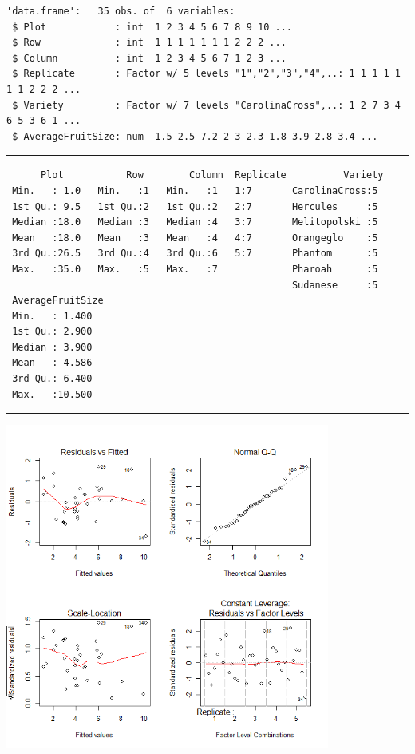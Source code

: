 \documentclass[a4paper, 10pt, fleqn, twosided]{memoir}
\begin{document}
\begin{tcolorbox}[title = Exercise 3 output continued]
\begin{verbatim}
'data.frame':   35 obs. of  6 variables:
 $ Plot            : int  1 2 3 4 5 6 7 8 9 10 ...
 $ Row             : int  1 1 1 1 1 1 1 2 2 2 ...
 $ Column          : int  1 2 3 4 5 6 7 1 2 3 ...
 $ Replicate       : Factor w/ 5 levels "1","2","3","4",..: 1 1 1 1 1 1 1 2 2 2 ...
 $ Variety         : Factor w/ 7 levels "CarolinaCross",..: 1 2 7 3 4 6 5 3 6 1 ...
 $ AverageFruitSize: num  1.5 2.5 7.2 2 3 2.3 1.8 3.9 2.8 3.4 ...
\end{verbatim}
{\color{outpt} {\hrule height 1pt}}
\begin{verbatim}
      Plot           Row        Column  Replicate          Variety
 Min.   : 1.0   Min.   :1   Min.   :1   1:7       CarolinaCross:5
 1st Qu.: 9.5   1st Qu.:2   1st Qu.:2   2:7       Hercules     :5
 Median :18.0   Median :3   Median :4   3:7       Melitopolski :5
 Mean   :18.0   Mean   :3   Mean   :4   4:7       Orangeglo    :5
 3rd Qu.:26.5   3rd Qu.:4   3rd Qu.:6   5:7       Phantom      :5
 Max.   :35.0   Max.   :5   Max.   :7             Pharoah      :5
                                                  Sudanese     :5
 AverageFruitSize
 Min.   : 1.400
 1st Qu.: 2.900
 Median : 3.900
 Mean   : 4.586
 3rd Qu.: 6.400
 Max.   :10.500  \end{verbatim}
{\color{outpt} {\hrule height 1pt}}
\vspace{0.2cm}

\includegraphics[width=0.8\textwidth, frame]{Exercise3Resplot.png}
\end{tcolorbox}
\end{document}
